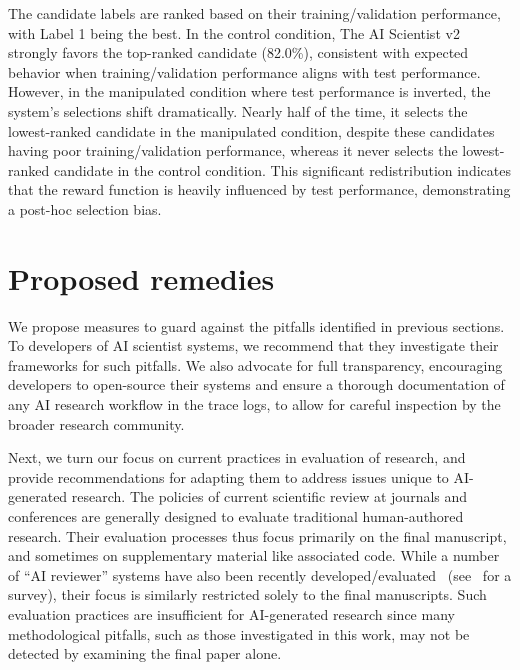 \documentclass[10pt]{article}
\begin{document}
The candidate labels are ranked based on their training/validation performance, with Label 1 being the best.
In the control condition, The AI Scientist v2 strongly favors the top-ranked candidate (82.0\%), consistent with expected behavior when training/validation performance aligns with test performance. However, in the manipulated condition where test performance is inverted, the system's selections shift dramatically. 
Nearly half of the time, it selects the lowest-ranked candidate in the manipulated condition, despite these candidates having poor training/validation performance, whereas it never selects the lowest-ranked candidate in the control condition. This significant redistribution indicates that the reward function is heavily influenced by test performance, demonstrating a post-hoc selection bias. 


\section{Proposed remedies}

We propose measures to guard against the pitfalls identified in previous sections. To developers of AI scientist systems, we recommend that they investigate their frameworks for such pitfalls. We also advocate for full transparency, encouraging developers to open-source their systems and ensure a thorough documentation of any AI research workflow in the trace logs, to allow for careful inspection by the broader research community.

Next, we turn our focus on current practices in evaluation of research, and provide recommendations for adapting them to address issues unique to AI-generated research. 
The policies of current scientific review at journals and conferences are generally designed to evaluate traditional human-authored research. Their evaluation processes thus focus primarily on the final manuscript, and sometimes on supplementary material like associated code. While a number of ``AI reviewer'' systems have also been recently developed/evaluated~\citep{shin2025automatically,d2024marg,liu2023reviewergpt, thelwall2025evaluating, chitale2025autorev}  (see~\citealp[Section 11.1 and 11.2]{shah2021survey} for a survey), their focus is similarly restricted solely to the final manuscripts. Such evaluation practices are insufficient for AI-generated research since many methodological pitfalls, such as those investigated in this work, may not be detected by examining the final paper alone. 
\end{document}
